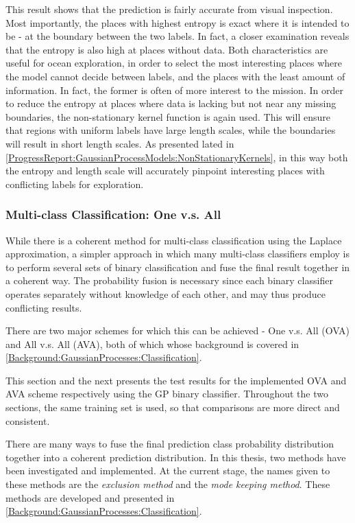 				This result shows that the prediction is fairly accurate from visual inspection. Most importantly, the places with highest entropy is exact where it is intended to be - at the boundary between the two labels. In fact, a closer examination reveals that the entropy is also high at places without data. Both characteristics are useful for ocean exploration, in order to select the most interesting places where the model cannot decide between labels, and the places with the least amount of information. In fact, the former is often of more interest to the mission. In order to reduce the entropy at places where data is lacking but not near any missing boundaries, the non-stationary kernel function is again used. This will ensure that regions with uniform labels have large length scales, while the boundaries will result in short length scales. As presented lated in \cref{ProgressReport:GaussianProcessModels:NonStationaryKernels}, in this way both the entropy and length scale will accurately pinpoint interesting places with conflicting labels for exploration.
				
				\FloatBarrier
											
			\subsubsection{Multi-class Classification: One v.s. All}
			
				While there is a coherent method for multi-class classification using the Laplace approximation, a simpler approach in which many multi-class classifiers employ is to perform several sets of binary classification and fuse the final result together in a coherent way. The probability fusion is necessary since each binary classifier operates separately without knowledge of each other, and may thus produce conflicting results.
				
				There are two major schemes for which this can be achieved - One v.s. All (OVA) and All v.s. All (AVA), both of which whose background is covered in \cref{Background:GaussianProcesses:Classification}. 
				
				This section and the next presents the test results for the implemented OVA and AVA scheme respectively using the GP binary classifier. Throughout the two sections, the same training set is used, so that comparisons are more direct and consistent.
				
				There are many ways to fuse the final prediction class probability distribution together into a coherent prediction distribution. In this thesis, two methods have been investigated and implemented. At the current stage, the names given to these methods are the \textit{exclusion method} and the \textit{mode keeping method}. These methods are developed and presented in \cref{Background:GaussianProcesses:Classification}. 
				
